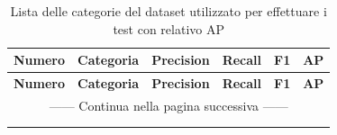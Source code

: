 \begin{center}
\begin{longtable}{|c|l|c|c|c|c|}

\hline \multicolumn{1}{|c|}{\textbf{Numero}} &\multicolumn{1}{c|}{\textbf{Categoria}} &\multicolumn{1}{c|}{\textbf{Precision}} &\multicolumn{1}{c|}{\textbf{Recall}} &\multicolumn{1}{c|}{\textbf{F1}} &\multicolumn{1}{c|}{\textbf{AP}} \\ \hline\endfirsthead

\hline \multicolumn{1}{|c|}{\textbf{Numero}} &\multicolumn{1}{c|}{\textbf{Categoria}} &\multicolumn{1}{c|}{\textbf{Precision}} &\multicolumn{1}{c|}{\textbf{Recall}} &\multicolumn{1}{c|}{\textbf{F1}} &\multicolumn{1}{c|}{\textbf{AP}}\\ \hline \endhead

\hline \multicolumn{6}{|c|}{{------ Continua nella pagina successiva ------}} \\ \hline
\endfoot

\hline

\caption{Lista delle categorie del dataset utilizzato per effettuare i test con relativo AP}
\label{lista categorie} \\

\endlastfoot



\end{longtable}
\end{center}

